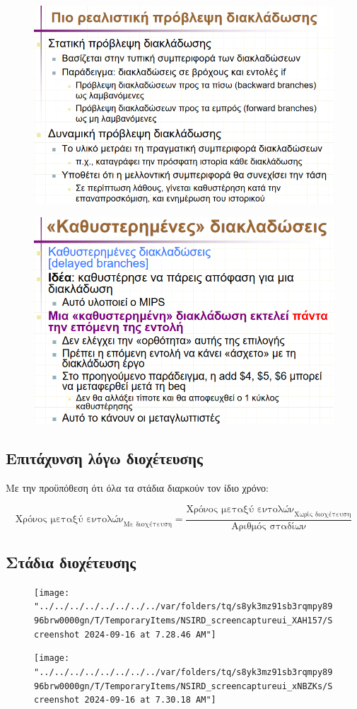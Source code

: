 \documentclass[11pt, oneside]{article}   	%
\begin{document}
\begin{figure}[h!]
	\centering
	\includegraphics[width=0.7\linewidth]{"Computer Architecture 2/screenshot007"}
	\caption{}
	\label{fig:screenshot007}
\end{figure}

\begin{figure}[h!]
	\centering
	\includegraphics[width=0.7\linewidth]{"Computer Architecture 2/screenshot008"}
	\caption{}
	\label{fig:screenshot008}
\end{figure}

\newpage


\subsection{Επιτάχυνση λόγω διοχέτευσης}

Με την προϋπόθεση ότι όλα τα στάδια διαρκούν τον ίδιο χρόνο:

\[\text{Χρόνος μεταξύ εντολών}_\text{Με διοχέτευση} = \frac{\text{Χρόνος μεταξύ εντολών}_\text{Χωρίς διοχέτευση}}{\text{Αριθμός σταδίων}}\]

\subsection{Στάδια διοχέτευσης}

\begin{figure}[h!]
	\centering
	\texttt{[image: "../../../../../../../../var/folders/tq/s8yk3mz91sb3rqmpy8996brw0000gn/T/TemporaryItems/NSIRD\_screencaptureui\_XAH157/Screenshot 2024-09-16 at 7.28.46 AM"]}
	\caption{}
	\label{fig:screenshot-2024-09-16-at-7}
\end{figure}

\begin{figure}[h!]
	\centering
	\texttt{[image: "../../../../../../../../var/folders/tq/s8yk3mz91sb3rqmpy8996brw0000gn/T/TemporaryItems/NSIRD\_screencaptureui\_xNBZKs/Screenshot 2024-09-16 at 7.30.18 AM"]}
	\caption{}
	\label{fig:screenshot-2024-09-16-at-71}
\end{figure}
\end{document}
